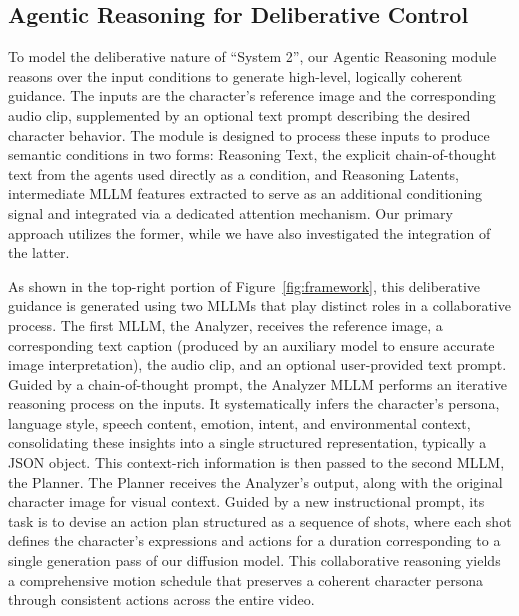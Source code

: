 

\subsection{Agentic Reasoning for Deliberative Control}



 To model the deliberative nature of ``System 2'', our Agentic Reasoning module reasons over the input conditions to generate high-level, logically coherent guidance. The inputs are the character's reference image and the corresponding audio clip, supplemented by an optional text prompt describing the desired character behavior. The module is designed to process these inputs to produce semantic conditions in two forms: Reasoning Text, the explicit chain-of-thought text from the agents used directly as a condition, and Reasoning Latents, intermediate MLLM features extracted to serve as an additional conditioning signal and integrated via a dedicated attention mechanism. Our primary approach utilizes the former, while we have also investigated the integration of the latter.


 As shown in the top-right portion of Figure~\ref{fig:framework}, this deliberative guidance is generated using two MLLMs that play distinct roles in a collaborative process. The first MLLM, the Analyzer, receives the reference image, a corresponding text caption (produced by an auxiliary model to ensure accurate image interpretation), the audio clip, and an optional user-provided text prompt. Guided by a chain-of-thought prompt, the Analyzer MLLM performs an iterative reasoning process on the inputs. It systematically infers the character's persona, language style, speech content, emotion, intent, and environmental context, consolidating these insights into a single structured representation, typically a JSON object. This context-rich information is then passed to the second MLLM, the Planner. The Planner receives the Analyzer's output, along with the original character image for visual context. Guided by a new instructional prompt, its task is to devise an action plan structured as a sequence of shots, where each shot defines the character's expressions and actions for a duration corresponding to a single generation pass of our diffusion model. This collaborative reasoning yields a comprehensive motion schedule that preserves a coherent character persona through consistent actions across the entire video.

